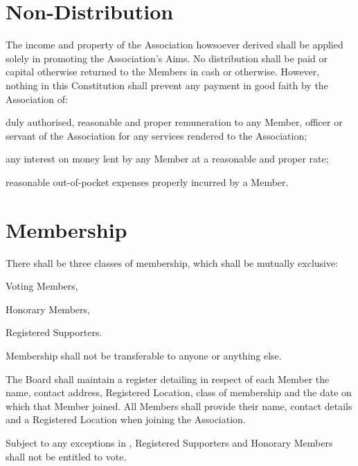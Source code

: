 \documentclass[10pt]{mk-articles-of-association}
\newcommand{\EC}[0]{Board}
\newcommand{\Exec}[0]{\EC{} }
\begin{document}


\section{Non-Distribution}

  The income and property of the Association howsoever derived shall be
  applied solely in promoting the Association’s Aims. No distribution shall
  be paid or capital otherwise returned to the Members in cash or otherwise.
  However, nothing in this Constitution shall prevent any payment in good
  faith by the Association of:
  \begin{constenum}
  \item duly authorised, reasonable and proper remuneration to any Member,
    officer or servant of the Association for any services rendered to the
    Association;
  \item any interest on money lent by any Member at a reasonable and proper
    rate; \ITor
  \item reasonable out-of-pocket expenses properly incurred by a Member.
  \end{constenum}




\section{Membership}
  \begin{constenum}

  \item There shall be three classes of membership, which shall be mutually
    exclusive:
    \begin{constenum}
      \item Voting Members,
      \item Honorary Members, \ITand
      \item Registered Supporters.
    \end{constenum}

  \item Membership shall not be transferable to anyone or anything else.

  \item The \Exec shall maintain a register detailing in respect of
    each Member the name, contact address, Registered Location,
    class of membership and the date on which that Member joined.
    All Members shall provide their name, contact details and a Registered
    Location when joining the Association.

  \item Subject to any exceptions in ,
    Registered Supporters and
    Honorary Members shall not be entitled to vote.

\end{constenum}
\end{document}
